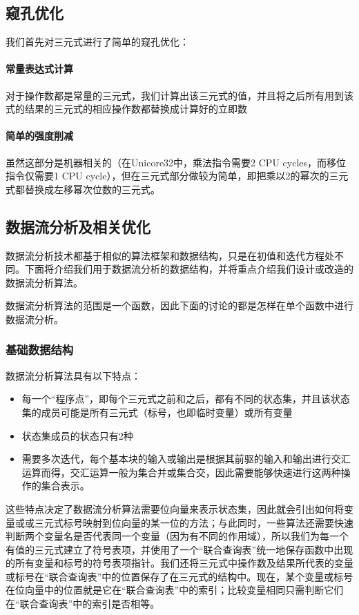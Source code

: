 \subsection{窥孔优化}
\label{peephole:intermidiate}
我们首先对三元式进行了简单的窥孔优化：
\paragraph*{常量表达式计算} 对于操作数都是常量的三元式，我们计算出该三元式的值，并且将之后所有用到该式的结果的三元式的相应操作数都替换成计算好的立即数
\paragraph*{简单的强度削减} 虽然这部分是机器相关的（在Unicore32中，乘法指令需要2 CPU cycles，而移位指令仅需要1 CPU cycle），但在三元式部分做较为简单，即把乘以2的幂次的三元式都替换成左移幂次位数的三元式。

\subsection{数据流分析及相关优化}
\label{dataflow}
数据流分析技术都基于相似的算法框架和数据结构，只是在初值和迭代方程处不同。下面将介绍我们用于数据流分析的数据结构，并将重点介绍我们设计或改造的数据流分析算法。

数据流分析算法的范围是一个函数，因此下面的讨论的都是怎样在单个函数中进行数据流分析。

\subsubsection{基础数据结构}
\label{jointtable}
数据流分析算法具有以下特点：
\begin{itemize}
	\item 每一个“程序点”，即每个三元式之前和之后，都有不同的状态集，并且该状态集的成员可能是所有三元式（标号，也即临时变量）或所有变量
	\item 状态集成员的状态只有2种
	\item 需要多次迭代，每个基本块的输入或输出是根据其前驱的输入和输出进行交汇运算而得，交汇运算一般为集合并或集合交，因此需要能够快速进行这两种操作的集合表示。 
\end{itemize}
这些特点决定了数据流分析算法需要位向量来表示状态集，因此就会引出如何将变量或或三元式标号映射到位向量的某一位的方法；与此同时，一些算法还需要快速判断两个变量名是否代表同一个变量（因为有不同的作用域），所以我们为每一个有值的三元式建立了符号表项，并使用了一个“联合查询表”统一地保存函数中出现的所有变量和标号的符号表项指针。我们还将三元式中操作数及结果所代表的变量或标号在“联合查询表”中的位置保存了在三元式的结构中。现在，某个变量或标号在位向量中的位置就是它在“联合查询表”中的索引；比较变量相同只需判断它们在“联合查询表”中的索引是否相等。

